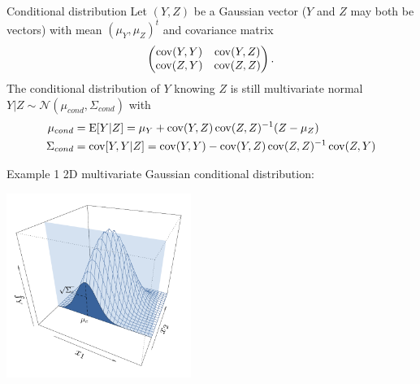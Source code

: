\begin{frame}{}
\begin{block}{Conditional distribution}
Let $(Y,Z)$ be a Gaussian vector ($Y$ and $Z$ may both be vectors) with mean $(\mu_Y,\mu_Z)^t$ and covariance matrix
\begin{equation*}
\begin{pmatrix}
	\operatorname*{cov}(Y,Y) & \operatorname*{cov}(Y,Z)\\
	\operatorname*{cov}(Z,Y) & \operatorname*{cov}(Z,Z)\\
\end{pmatrix}.
\end{equation*}
The conditional distribution of $Y$ knowing $Z$ is still multivariate normal $Y|Z \sim \mathcal{N}(\mu_{cond},\Sigma_{cond})$ with
\begin{equation*}
\begin{split}
	\mu_{cond} &= \operatorname*{E} [Y|Z] = \mu_Y + \operatorname*{cov}(Y,Z) \operatorname*{cov}(Z,Z)^{-1} (Z-\mu_Z)\\
	\Sigma_{cond} &= \operatorname*{cov} [Y,Y|Z] = \operatorname*{cov}(Y,Y) - \operatorname*{cov}(Y,Z) \operatorname*{cov}(Z,Z)^{-1} \operatorname*{cov}(Z,Y)
\end{split}
\end{equation*}
\end{block}
\end{frame}

\begin{frame}{}
\begin{exampleblock}{Example 1}
2D multivariate Gaussian conditional distribution:\\
\begin{center}
\includegraphics[height=6cm]{1_stat_models/figures/ch1_condpdf1}
\end{center}
\end{exampleblock}
\end{frame}

